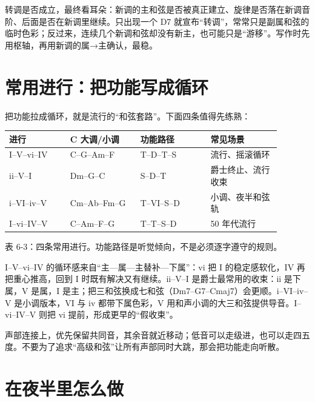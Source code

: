 转调是否成立，最终看耳朵：新调的主和弦是否被真正建立、旋律是否落在新调音阶、后面是否在新调里继续。只出现一个 D7 就宣布“转调”，常常只是副属和弦的临时色彩；反过来，连续几个新调和弦却没有新主，也可能只是“游移”。写作时先用枢轴，再用新调的属→主确认，最稳。

\section{常用进行：把功能写成循环}

把功能拉成循环，就是流行的“和弦套路”。下面四条值得先练熟：

\begin{center}
\small
\begin{tabular}{p{0.20\linewidth}p{0.23\linewidth}p{0.23\linewidth}p{0.23\linewidth}}
\toprule
进行 & C 大调/小调 & 功能路径 & 常见场景 \\
\midrule
I–V–vi–IV & C–G–Am–F & T–D–T–S & 流行、摇滚循环 \\
ii–V–I & Dm–G–C & S–D–T & 爵士终止、流行收束 \\
i–VI–iv–V & Cm–Ab–Fm–G & T–VI–S–D & 小调、夜半和弦轨 \\
I–vi–IV–V & C–Am–F–G & T–T–S–D & 50 年代流行 \\
\bottomrule
\end{tabular}

表 6-3：四条常用进行。功能路径是听觉倾向，不是必须逐字遵守的规则。
\end{center}

I–V–vi–IV 的循环感来自“主—属—主替补—下属”：vi 把 I 的稳定感软化，IV 再把重心推高，回到 I 时既有解决又有继续。ii–V–I 是爵士最常用的收束：ii 是下属，V 是属，I 是主；把三和弦换成七和弦（Dm7–G7–Cmaj7）会更顺。i–VI–iv–V 是小调版本，VI 与 iv 都带下属色彩，V 用和声小调的大三和弦提供导音。I–vi–IV–V 则把 vi 提前，形成更早的“假收束”。

声部连接上，优先保留共同音，其余音就近移动；低音可以走级进，也可以走四五度。不要为了追求“高级和弦”让所有声部同时大跳，那会把功能走向听散。

\section{在夜半里怎么做}

